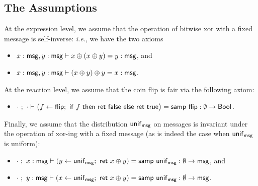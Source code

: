 \subsection{The Assumptions}
At the expression level, we assume that the operation of bitwise xor with a fixed message is self-inverse: \emph{i.e.}, we have the two axioms
\begin{itemize}
\item $x : \mathsf{msg}, y : \mathsf{msg} \vdash x \oplus (x \oplus y) = y : \mathsf{msg}$, and
\item $x : \mathsf{msg}, y : \mathsf{msg} \vdash (x \oplus y) \oplus y = x : \mathsf{msg}$.
\end{itemize}
At the reaction level, we assume that the coin flip is fair via the following axiom:
\begin{itemize}
\item $\cdot \ ; \ \cdot \vdash \big(f \leftarrow \mathsf{flip}; \ \mathsf{if} \ f \ \mathsf{then} \ \mathsf{ret} \ \mathsf{false} \ \mathsf{else} \ \mathsf{ret} \ \mathsf{true}\big) = \mathsf{samp} \ \mathsf{flip} : \emptyset \to \mathsf{Bool}$.
\end{itemize}
Finally, we assume that the distribution $\mathsf{unif}_{\mathsf{msg}}$ on messages is invariant under the operation of xor-ing with a fixed message (as is indeed the case when $\mathsf{unif}_{\mathsf{msg}}$ is uniform):
\begin{itemize}
\item $\cdot \ ; \ x : \mathsf{msg} \vdash (y \leftarrow \mathsf{unif}_{\mathsf{msg}}; \ \mathsf{ret} \ x \oplus y) = \mathsf{samp} \ \mathsf{unif}_{\mathsf{msg}} : \emptyset \to \mathsf{msg}$, and
\item $\cdot \ ; \ y : \mathsf{msg} \vdash (x \leftarrow \mathsf{unif}_{\mathsf{msg}}; \ \mathsf{ret} \ x \oplus y) = \mathsf{samp} \ \mathsf{unif}_{\mathsf{msg}} : \emptyset \to \mathsf{msg}$.
\end{itemize}

